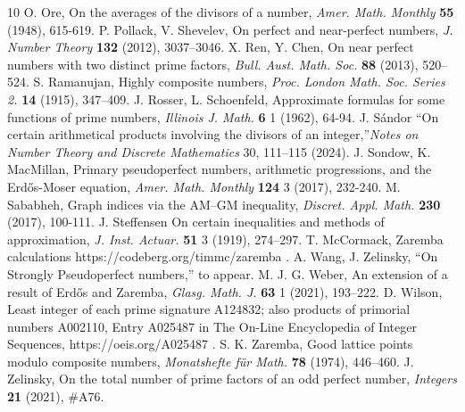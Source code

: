 \documentclass{article}
\begin{document}
\begin{thebibliography}{10}
 O. Ore, On the averages of the divisors of a number, \textit{Amer. Math. Monthly } {\bf 55} (1948), 615-619.  
 P. Pollack, V. Shevelev, On perfect and near-perfect numbers, \textit{J. Number Theory} {\bf 132} (2012), 3037–3046. 
 X. Ren, Y. Chen,  On near perfect numbers with two distinct prime factors, \textit{Bull. Aust. Math. Soc.} {\bf 88} (2013), 520–524.
 S. Ramanujan,   Highly composite numbers, \textit{Proc. London Math. Soc. Series 2.} {\bf 14} (1915), 347–409.
 J. Rosser, L. Schoenfeld, Approximate formulas for some functions of prime numbers, \textit{Illinois J. Math.} {\bf 6} 1  (1962), 64-94.
 J. S\'{a}ndor ``On certain arithmetical products
involving the divisors of an integer,''\textit{Notes on Number Theory and Discrete Mathematics} {30}, 111–115 (2024).
 J. Sondow, K. MacMillan, 
Primary pseudoperfect numbers, arithmetic progressions, and the Erd\H{o}s-Moser equation, \textit{Amer. Math. Monthly}  {\bf 124} 3  (2017), 232-240.
 M. Sababheh, Graph indices via the AM–GM inequality, \textit{Discret. Appl. Math.} {\bf 230} (2017), 100-111.
 J. Steffensen  On certain inequalities and methods of approximation, \textit{J. Inst. Actuar.}  {\bf 51} 3 (1919), 274–297.
 T. McCormack, Zaremba calculations https://codeberg.org/timmc/zaremba  .
 A. Wang, J. Zelinsky, ``On Strongly Pseudoperfect numbers,'' to appear.
 M. J. G. Weber, An extension of a result of Erd\H{o}s and Zaremba, \textit{Glasg. Math. J.} {\bf 63} 1 (2021),  193–222.
 D. Wilson, Least integer of each prime signature A124832; also products of primorial numbers A002110, Entry A025487 in The On-Line Encyclopedia of Integer Sequences, https://oeis.org/A025487 . 
 S. K. Zaremba,  Good lattice points modulo composite numbers, \textit{Monatshefte f{\"u}r Math.} {\bf 78} (1974),  446–460.
 J. Zelinsky,  On the total number of prime factors of an odd perfect number,  \textit{Integers} {\bf 21} (2021), \#A76.
\end{thebibliography}
\end{document}
